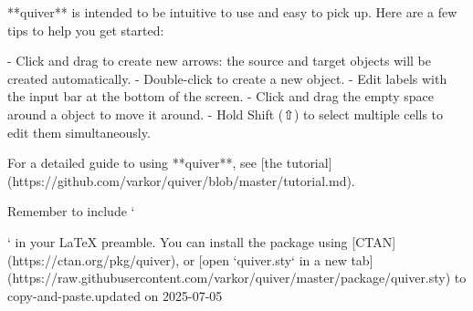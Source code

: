 \documentclass[preview]{standalone}
\begin{document}
**quiver** is intended to be intuitive to use and easy to pick up. Here are a few tips to help you get started:

- Click and drag to create new arrows: the source and target objects will be created automatically.
- Double-click to create a new object.
- Edit labels with the input bar at the bottom of the screen.
- Click and drag the empty space around a object to move it around.
- Hold Shift (⇧) to select multiple cells to edit them simultaneously.

For a detailed guide to using **quiver**, see [the tutorial](https://github.com/varkor/quiver/blob/master/tutorial.md).

Remember to include `\usepackage{quiver}` in your LaTeX preamble. You can install the package using [CTAN](https://ctan.org/pkg/quiver), or [open `quiver.sty` in a new tab](https://raw.githubusercontent.com/varkor/quiver/master/package/quiver.sty) to copy-and-paste.updated on 2025-07-05

\end{document}
